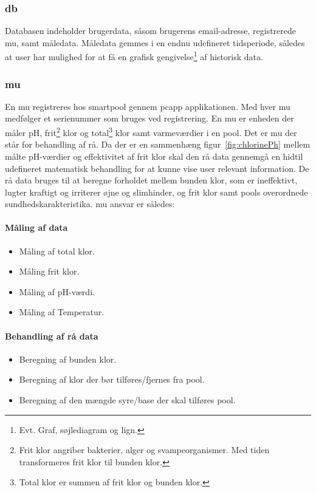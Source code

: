 \subsubsection{\gls{db}}
Databasen indeholder brugerdata, såsom brugerens email-adresse, registrerede \gls{mu}, samt måledata. Måledata gemmes i en endnu udefineret tidsperiode, således at \gls{user} har mulighed for at få en grafisk gengivelse\footnote{Evt. Graf, søjlediagram og lign.} af historisk data.

\subsubsection{\gls{mu}}
En \gls{mu} registreres hos \gls{smartpool} gennem \gls{pcapp} applikationen. Med hver \gls{mu} medfølger et serienummer som bruges ved registrering. En \gls{mu} er enheden der måler pH, frit\footnote{Frit klor angriber bakterier, alger og svampeorganismer. Med tiden transformeres frit klor til bunden klor.} klor og total\footnote{Total klor er summen af frit klor og bunden klor.} klor samt varmeværdier i en \gls{pool}. Det er \gls{mu} der står for behandling af rå. Da der er en sammenhæng figur~\ref{fig:chlorinePh} mellem målte pH-værdier og effektivitet af frit klor skal den rå data gennemgå en hidtil udefineret matematisk behandling for at kunne vise \gls{user} relevant information. De rå data bruges til at beregne forholdet mellem bunden klor, som er ineffektivt, lugter kraftigt og irriterer øjne og slimhinder, og frit klor samt \glspl{pool} overordnede sundhedskarakteristika. \gls{mu} ansvar er således:

\paragraph{Måling af data}
\begin{itemize}
	\item Måling af total klor.
	\item Måling frit klor.
	\item Måling af pH-værdi.
	\item Måling af Temperatur.
\end{itemize}

\paragraph{Behandling af rå data}
\begin{itemize}
	\item Beregning af bunden klor.
	\item Beregning af klor der bør tilføres/fjernes fra \gls{pool}.
	\item Beregning af den mængde syre/base der skal tilføres \gls{pool}.
\end{itemize}

